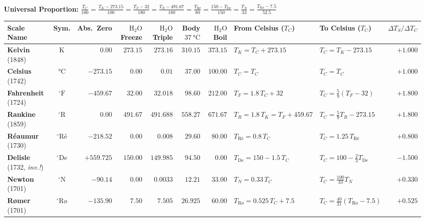 \documentclass[10pt,twoside,openany,letterpaper]{book}
\begin{document}
\begin{quicksheet}
\begin{formulacard}
\textbf{Universal Proportion:} $\displaystyle \frac{T_C}{100} = \frac{T_K - 273.15}{100} = \frac{T_F - 32}{180} = \frac{T_R - 491.67}{180} = \frac{T_{\text{R\'e}}}{80} = \frac{150 - T_{\mathrm{De}}}{150} = \frac{T_N}{33} = \frac{T_{\text{R\o}} - 7.5}{52.5}$
\par\smallskip\noindent
\scriptsize\setlength{\tabcolsep}{2.8pt}\renewcommand{\arraystretch}{1.10}
\begin{tabularx}{\linewidth}{@{}l c r r r r r l l r@{}}
\toprule
\textbf{Scale Name} & \textbf{Sym.} & \textbf{Abs.\ Zero} & \textbf{$\mathrm{H_2O}$ Freeze} & \textbf{$\mathrm{H_2O}$ Triple} & \textbf{Body $\SI{37}{\celsius}$} & \textbf{$\mathrm{H_2O}$ Boil} & \textbf{From Celsius ($T_C$)} & \textbf{To Celsius ($T_C$)} & $\Delta T_S/\Delta T_C$ \\
\midrule
\textbf{Kelvin} (1848) & $\si{\kelvin}$ & $0.00$ & $273.15$ & $273.16$ & $310.15$ & $373.15$ & $T_K = T_C + 273.15$ & $T_C = T_K - 273.15$ & $+1.000$ \\
\textbf{Celsius} (1742) & $\si{\celsius}$ & $-273.15$ & $0.00$ & $0.01$ & $37.00$ & $100.00$ & $T_C = T_C$ & $T_C = T_C$ & $+1.000$ \\
\textbf{Fahrenheit} (1724) & $^\circ\mathrm{F}$ & $-459.67$ & $32.00$ & $32.018$ & $98.60$ & $212.00$ & $T_F = 1.8\,T_C + 32$ & $T_C = \frac{5}{9}(T_F - 32)$ & $+1.800$ \\
\textbf{Rankine} (1859) & $^\circ\mathrm{R}$ & $0.00$ & $491.67$ & $491.688$ & $558.27$ & $671.67$ & $T_R = 1.8\,T_K = T_F + 459.67$ & $T_C = \frac{5}{9}T_R - 273.15$ & $+1.800$ \\
\textbf{R\'eaumur} (1730) & $^\circ\text{R\'e}$ & $-218.52$ & $0.00$ & $0.008$ & $29.60$ & $80.00$ & $T_{\text{R\'e}} = 0.8\,T_C$ & $T_C = 1.25\,T_{\text{R\'e}}$ & $+0.800$ \\
\textbf{Delisle} (1732, \emph{inv.!}) & $^\circ\mathrm{De}$ & $+559.725$ & $150.00$ & $149.985$ & $94.50$ & $0.00$ & $T_{\mathrm{De}} = 150 - 1.5\,T_C$ & $T_C = 100 - \frac{2}{3}T_{\mathrm{De}}$ & $\mathbf{-1.500}$ \\
\textbf{Newton} (1701) & $^\circ\mathrm{N}$ & $-90.14$ & $0.00$ & $0.0033$ & $12.21$ & $33.00$ & $T_N = 0.33\,T_C$ & $T_C = \frac{100}{33}T_N$ & $+0.330$ \\
\textbf{R\o mer} (1701) & $^\circ\text{R\o}$ & $-135.90$ & $7.50$ & $7.505$ & $26.925$ & $60.00$ & $T_{\text{R\o}} = 0.525\,T_C + 7.5$ & $T_C = \frac{40}{21}(T_{\text{R\o}} - 7.5)$ & $+0.525$ \\

\end{tabularx}
\end{formulacard}
\end{quicksheet}
\end{document}
